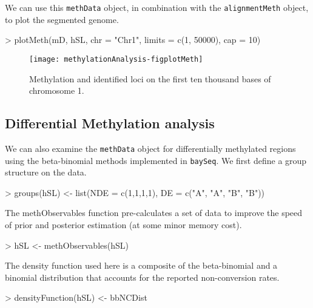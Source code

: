 \documentclass[a4paper]{article}
\begin{document}
We can use this \verb'methData' object, in combination with the \verb'alignmentMeth' object, to plot the segmented genome.

\begin{Schunk}
\begin{Sinput}
> plotMeth(mD, hSL, chr = "Chr1", limits = c(1, 50000), cap = 10)
\end{Sinput}
\end{Schunk}

\begin{figure}[!ht]
\begin{center}
\texttt{[image: methylationAnalysis-figplotMeth]}
\caption{Methylation and identified loci on the first ten thousand bases of chromosome 1.}
\label{fig:plotMeth}
\end{center}
\end{figure}



\subsection*{Differential Methylation analysis}

We can also examine the \verb'methData' object for differentially methylated regions using the beta-binomial methods \cite{Hardcastle:2013} implemented in \verb'baySeq'. We first define a group structure on the data.

\begin{Schunk}
\begin{Sinput}
> groups(hSL) <- list(NDE = c(1,1,1,1), DE = c("A", "A", "B", "B"))
\end{Sinput}
\end{Schunk}

The methObservables function pre-calculates a set of data to improve the speed of prior and posterior estimation (at some minor memory cost).
\begin{Schunk}
\begin{Sinput}
> hSL <- methObservables(hSL)
\end{Sinput}
\end{Schunk}

The density function used here is a composite of the beta-binomial and a binomial distribution that accounts for the reported non-conversion rates.
\begin{Schunk}
\begin{Sinput}
> densityFunction(hSL) <- bbNCDist
\end{Sinput}
\end{Schunk}
\end{document}
